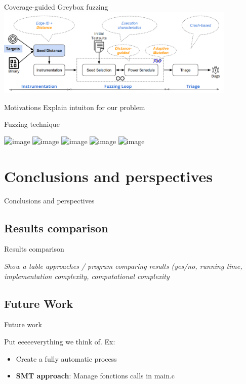 \documentclass{beamer}
\begin{document}
\begin{frame}{Coverage-guided Greybox fuzzing}
\includegraphics[width=11.5cm]{Figures/Fuzzing/graph3.png}
\end{frame}

\begin{frame}{Motivations}
Explain intuiton for our problem
\end{frame}

\begin{frame}{Fuzzing technique}

\includegraphics<1>[scale=0.3]{Figures/Fuzzing/1.png}
\includegraphics<2>[scale=0.3]{Figures/Fuzzing/2.png}
\includegraphics<3>[scale=0.3]{Figures/Fuzzing/3.png}
\includegraphics<4>[scale=0.3]{Figures/Fuzzing/4.png}
\includegraphics<5>[scale=0.3]{Figures/Fuzzing/5.png}

\end{frame}


\section{Conclusions and perspectives}

\begin{frame}
\centering
\LARGE Conclusions and perspectives
\end{frame}

\subsection{Results comparison}

\begin{frame}{Results comparison}

\textit{Show a table approaches / program comparing results (yes/no, running time, implementation complexity, computational complexity } \\

\end{frame}

\subsection{Future Work}
\begin{frame}{Future work}

Put eeeeeverything we think of. Ex:

\begin{itemize}
\item Create a fully automatic process
\item \textbf{SMT approach}: Manage fonctions calls in main.c 
\end{itemize}

\end{frame}
\end{document}
